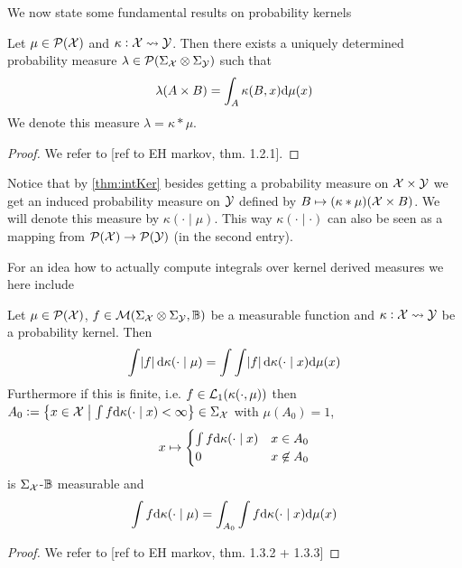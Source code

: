 \documentclass{article}
\begin{document}
We now state some fundamental results on probability kernels
\begin{thm}
  Let $\mu \in \mathcal{P}(\mathcal{X})$ and $\kappa : \mathcal{X} \leadsto \mathcal{Y}$.
  Then there exists a uniquely determined probability measure
  $\lambda \in \mathcal{P}(\Sigma_\mathcal{X} \otimes \Sigma_\mathcal{Y})$
  such that
  \[ \lambda(A \times B) = \int_A \kappa(B, x) \mathrm{d} \mu(x) \]
  \label{thm:intKer}
  We denote this measure $\lambda = \kappa * \mu$.
\end{thm}
\begin{proof}
  We refer to [ref to EH markov, thm. 1.2.1].
\end{proof}

Notice that by \cref{thm:intKer}
besides getting a probability measure on $\mathcal{X} \times \mathcal{Y}$
we get an induced probability measure
on $\mathcal{Y}$ defined by $B \mapsto (\kappa * \mu)(\mathcal{X} \times B)$.
We will denote this measure by $\kappa(\cdot \mid \mu)$.
This way $\kappa(\cdot \mid \cdot)$ can also be seen as a mapping from
$\mathcal{P}(\mathcal{X}) \to \mathcal{P}(\mathcal{Y})$ (in the second entry).

For an idea how to actually compute integrals over kernel derived measures
we here include
\begin{thm}
  Let $\mu \in \mathcal{P}(\mathcal{X})$,
  $f \in \mathcal{M}(\Sigma_\mathcal{X} \otimes \Sigma_\mathcal{Y}, \mathbb{B})$
  be a measurable function and
  $\kappa : \mathcal{X} \leadsto \mathcal{Y}$ be a probability kernel.
  Then
  \[ \int \abs{f} \mathrm{d} \kappa(\cdot \mid \mu)
  = \int \int \abs{f} \mathrm{d} \kappa(\cdot \mid x) \mathrm{d} \mu(x) \]
  Furthermore if this is finite, i.e. $f \in \mathcal{L}_1(\kappa(\cdot, \mu))$
  then $A_0 \vcentcolon= \left\{ x \in \mathcal{X} \;\middle\vert\;
    \int f \mathrm{d} \kappa(\cdot \mid x) < \infty \right\}
  \in \Sigma_\mathcal{X}$
  with $\mu(A_0) = 1$, 
  \[ x \mapsto \begin{cases}
      \int f \mathrm{d} \kappa(\cdot \mid x) & x \in A_0
      \\ 0 & x \not\in A_0
  \end{cases} \]
  is $\Sigma_\mathcal{X}$-$\mathbb{B}$ measurable and
  \[ \int f \mathrm{d} \kappa(\cdot \mid \mu)
  = \int_{A_0} \int f \mathrm{d} \kappa(\cdot \mid x) \mathrm{d} \mu(x) \]  
  \label{thm:extTonFub}
\end{thm}
\begin{proof}
  We refer to [ref to EH markov, thm. 1.3.2 + 1.3.3]
\end{proof}
\end{document}
